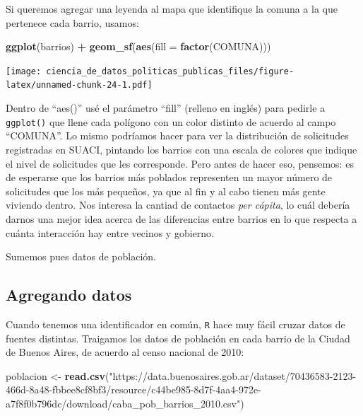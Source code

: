 \documentclass[]{book}
\newenvironment{Shaded}{\begin{snugshade}}{\end{snugshade}}
\newcommand{\KeywordTok}[1]{\textcolor[rgb]{0.13,0.29,0.53}{\textbf{#1}}}
\newcommand{\DataTypeTok}[1]{\textcolor[rgb]{0.13,0.29,0.53}{#1}}
\newcommand{\StringTok}[1]{\textcolor[rgb]{0.31,0.60,0.02}{#1}}
\newcommand{\OperatorTok}[1]{\textcolor[rgb]{0.81,0.36,0.00}{\textbf{#1}}}
\newcommand{\NormalTok}[1]{#1}
\begin{document}
Si queremos agregar una leyenda al mapa que identifique la comuna a la
que pertenece cada barrio, usamos:

\begin{Shaded}
\begin{Highlighting}[]
\KeywordTok{ggplot}\NormalTok{(barrios) }\OperatorTok{+}
\StringTok{    }\KeywordTok{geom_sf}\NormalTok{(}\KeywordTok{aes}\NormalTok{(}\DataTypeTok{fill =} \KeywordTok{factor}\NormalTok{(COMUNA)))}
\end{Highlighting}
\end{Shaded}

\texttt{[image: ciencia\_de\_datos\_politicas\_publicas\_files/figure-latex/unnamed-chunk-24-1.pdf]}

Dentro de ``aes()'' usé el parámetro ``fill'' (relleno en inglés) para
pedirle a \texttt{ggplot()} que llene cada polígono con un color
distinto de acuerdo al campo ``COMUNA''. Lo mismo podríamos hacer para
ver la distribución de solicitudes registradas en SUACI, pintando los
barrios con una escala de colores que indique el nivel de solicitudes
que les corresponde. Pero antes de hacer eso, pensemos: es de esperarse
que los barrios más poblados representen un mayor número de solicitudes
que los más pequeños, ya que al fin y al cabo tienen más gente viviendo
dentro. Nos interesa la cantiad de contactos \emph{per cápita}, lo cuál
debería darnos una mejor idea acerca de las diferencias entre barrios en
lo que respecta a cuánta interacción hay entre vecinos y gobierno.

Sumemos pues datos de población.

\subsection{Agregando datos}\label{agregando-datos}

Cuando tenemos una identificador en común, \texttt{R} hace muy fácil
cruzar datos de fuentes distintas. Traigamos los datos de población en
cada barrio de la Ciudad de Buenos Aires, de acuerdo al censo nacional
de 2010:

\begin{Shaded}
\begin{Highlighting}[]
\NormalTok{poblacion <-}\StringTok{ }\KeywordTok{read.csv}\NormalTok{(}\StringTok{"https://data.buenosaires.gob.ar/dataset/70436583-2123-466d-8a48-fbbee8cf8bf3/resource/c44be985-8d7f-4aa4-972e-a7f8f0b796dc/download/caba_pob_barrios_2010.csv"}\NormalTok{)}
\end{Highlighting}
\end{Shaded}
\end{document}
